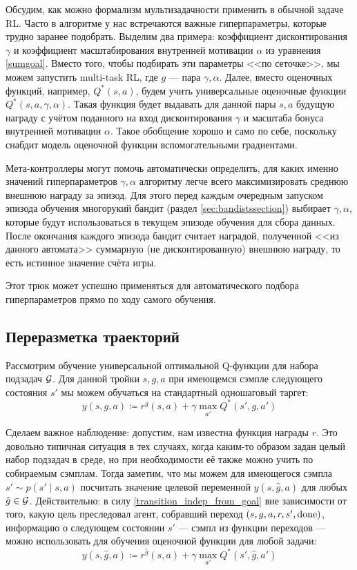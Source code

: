 Обсудим, как можно формализм мультизадачности применить в обычной задаче RL. Часто в алгоритме у нас встречаются важные гиперпараметры, которые трудно заранее подобрать. Выделим два примера: коэффициент дисконтирования $\gamma$ и коэффициент масштабирования внутренней мотивации $\alpha$ из уравнения \eqref{sumgoal}. Вместо того, чтобы подбирать эти параметры <<по сеточке>>, мы можем запустить multi-task RL, где $g$ --- пара $\gamma, \alpha$. Далее, вместо оценочных функций, например, $Q^*(s, a)$, будем учить универсальные оценочные функции $Q^*(s, a, \gamma, \alpha)$. Такая функция будет выдавать для данной пары $s, a$ будущую награду с учётом поданного на вход дисконтирования $\gamma$ и масштаба бонуса внутренней мотивации $\alpha$. Такое обобщение хорошо и само по себе, поскольку снабдит модель оценочной функции вспомогательными градиентами.

Мета-контроллеры могут помочь автоматически определить, для каких именно значений гиперпараметров $\gamma, \alpha$ алгоритму легче всего максимизировать среднюю внешнюю награду за эпизод. Для этого перед каждым очередным запуском эпизода обучения многорукий бандит (раздел \ref{sec:bandistssection}) выбирает $\gamma, \alpha$, которые будут использоваться в текущем эпизоде обучения для сбора данных. После окончания каждого эпизода бандит считает наградой, полученной <<из данного автомата>> суммарную (не дисконтированную) внешнюю награду, то есть истинное значение счёта игры. 

Этот трюк может успешно применяться для автоматического подбора гиперпараметров прямо по ходу самого обучения.

\subsection{Переразметка траекторий}\label{subsec:hindsight}

Рассмотрим обучение универсальной оптимальной Q-функции для набора подзадач $\mathcal{G}$. Для данной тройки $s, g, a$ при имеющемся сэмпле следующего состояния $s'$ мы можем обучаться на стандартный одношаговый таргет:
$$y(s, g, a) \coloneqq r^g(s, a) + \gamma \max_{a'} Q^*(s', g, a')$$

Сделаем важное наблюдение: допустим, нам известна функция награды $r$. Это довольно типичная ситуация в тех случаях, когда каким-то образом задан целый набор подзадач в среде, но при необходимости её также можно учить по собираемым сэмплам. Тогда заметим, что мы можем для имеющегося сэмпла $s' \sim p(s' \mid s, a)$ посчитать значение целевой переменной $y(s, \hat{g}, a)$ для любых $\hat{g} \in \mathcal{G}$. Действительно: в силу \eqref{transition_indep_from_goal} вне зависимости от того, какую цель преследовал агент, собравший переход $(s, g, a, r, s', \mathrm{done})$, информацию о следующем состоянии $s'$ --- сэмпл из функции переходов --- можно использовать для обучения оценочной функции для любой задачи:
$$y(s, \hat{g}, a) \coloneqq r^{\hat{g}}(s, a) + \gamma \max_{a'} Q^*(s', \hat{g}, a')$$

